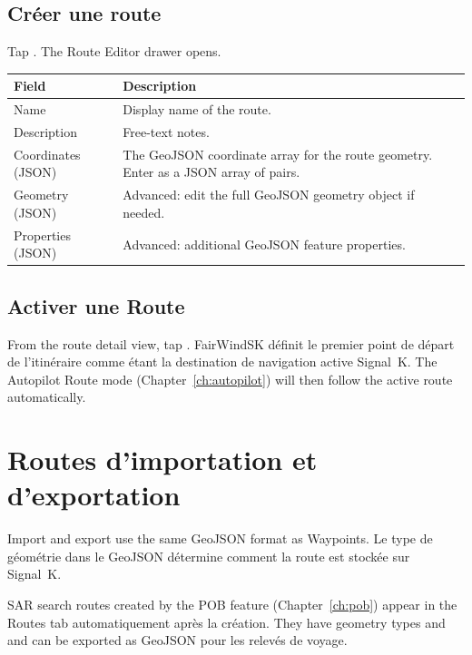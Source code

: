 \subsection{Créer une route}

Tap . The Route Editor drawer opens.

\begin{longtable}{L{3cm} L{10.7cm}}
\toprule
{}
{\sffamily\bfseries\color{white} Field} &
{\sffamily\bfseries\color{white} Description} \\
\midrule
Name & Display name of the route. \\
Description & Free-text notes. \\
Coordinates (JSON) & The GeoJSON coordinate array for the route geometry. Enter as a JSON array of  pairs. \\
Geometry (JSON) & Advanced: edit the full GeoJSON geometry object if needed. \\
Properties (JSON) & Advanced: additional GeoJSON feature properties. \\
\bottomrule
\end{longtable}

\subsection{Activer une Route}

From the route detail view, tap .
FairWindSK définit le premier point de départ de l'itinéraire comme étant la destination de navigation active Signal~K.
The Autopilot Route mode (Chapter~\ref{ch:autopilot}) will then follow the active route automatically.

\section{Routes d'importation et d'exportation}

Import and export use the same GeoJSON  format as Waypoints.
Le type de géométrie dans le GeoJSON détermine comment la route est stockée sur Signal~K.

\begin{tipbox}
SAR search routes created by the POB feature (Chapter~\ref{ch:pob}) appear in the Routes tab
automatiquement après la création.
They have geometry types  and  and can be exported as GeoJSON
pour les relevés de voyage.
\end{tipbox}

